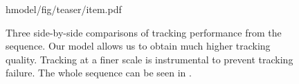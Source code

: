 \begin{figure}[H]
\centering
\begin{overpic}
[width=\linewidth]
{hmodel/fig/teaser/item.pdf}
\end{overpic}
\vspace{-.2in}
\caption{
% 
% 
Three side-by-side comparisons of tracking performance from the  sequence. Our model allows us to obtain much higher tracking quality.
Tracking at a finer scale is instrumental to prevent tracking failure. 
The whole sequence can be seen in \VideoHTrack{}.
% 
%
}
\label{fig:teaser}
\end{figure}